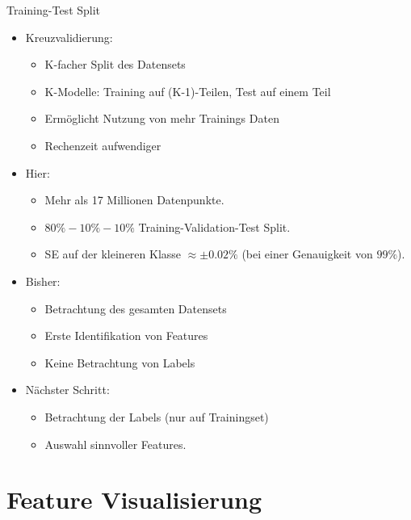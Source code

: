 \begin{frame}{Training-Test Split}

{
\begin{itemize}
\item Kreuzvalidierung:
\begin{itemize}
\item K-facher Split des Datensets
\item K-Modelle: Training auf (K-1)-Teilen, Test auf einem Teil
\item Ermöglicht Nutzung von mehr Trainings Daten
\item Rechenzeit aufwendiger
\end{itemize}
\item Hier:
\begin{itemize}
\item Mehr als 17 Millionen Datenpunkte.
\item $80\%-10\%-10\%$ Training-Validation-Test Split.
\item SE auf der kleineren Klasse $\approx \pm 0.02\%$ (bei einer Genauigkeit von $99\%$).
\end{itemize}
\end{itemize}
}
\end{frame}

\begin{frame}
\centering
{}
{
\begin{itemize}
\item Bisher:
\begin{itemize}
\item Betrachtung des gesamten Datensets
\item Erste Identifikation von Features
\item Keine Betrachtung von Labels
\end{itemize}
\item Nächster Schritt:
\begin{itemize}
\item Betrachtung der Labels (nur auf Trainingset)
\item Auswahl sinnvoller Features.
\end{itemize}
\end{itemize}
}
\end{frame}

\section{Feature Visualisierung}

